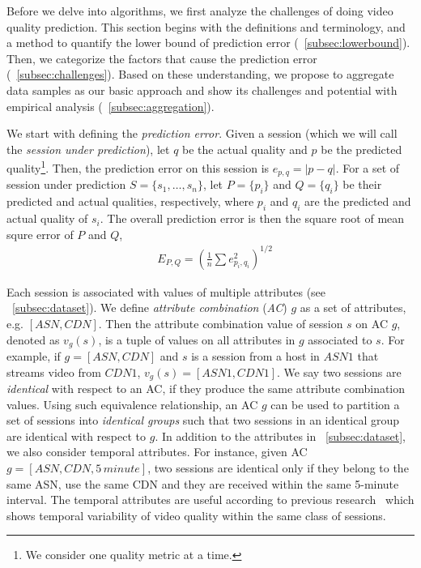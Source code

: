 \label{sec:challenges}


Before we delve into algorithms, we first analyze the challenges of doing video quality prediction. This section begins with the definitions and terminology, and a method to quantify the lower bound of prediction error (\Section~\ref{subsec:lowerbound}). Then, we categorize the factors that cause the prediction error (\Section~\ref{subsec:challenges}). Based on these understanding, we propose to aggregate data samples as our basic approach and show its challenges and potential with empirical analysis (\Section~\ref{subsec:aggregation}).


\label{subsec:lowerbound}


 We start with defining the {\it prediction error}.  Given a session
(which we will call the {\it session under prediction}), let $q$ be
the actual quality and $p$ be the predicted quality\footnote{We consider one quality metric at a time.}. Then, the
prediction error on this session is $e_{p,q}=|p-q|$.
For a set of session under prediction $S=\{s_1,\dots,s_n\}$, let $P=\{p_i\}$ and $Q=\{q_i\}$ be their predicted and actual qualities, respectively, where $p_i$ and $q_i$ are the predicted and actual quality of $s_i$. The overall prediction error is then the square root of mean squre error of $P$ and $Q$, 
\begin{align}
&E_{P,Q}=\left(\frac{1}{n}\sum e_{p_i,q_i}^2\right)^{1/2}
\end{align}

 Each session is associated with values of multiple attributes (see \Section~\ref{subsec:dataset}). We define {\it attribute combination} ({\it AC}) $g$ as a set of attributes, e.g. $[ASN, CDN]$. Then the attribute combination value of session $s$ on AC $g$, denoted as $v_g(s)$, is a tuple of values on all attributes in $g$ associated to $s$. For example, if $g=[ASN,CDN]$ and $s$ is a session from a host in $ASN1$ that streams video from $CDN1$, $v_g(s)=[ASN1, CDN1]$. We say two sessions are {\it identical} with respect to an AC, if they produce the same attribute combination values. Using such equivalence relationship, an AC $g$ can be used to partition a set of sessions into {\it identical groups} such that two sessions in an identical group are identical with respect to $g$.
 In addition to the attributes in \Section~\ref{subsec:dataset}, we also consider temporal attributes. For instance, given AC $g=[ASN, CDN, 5\,minute]$, two sessions are identical only if they belong to the same ASN, use the same CDN and they are received within the same 5-minute interval. The temporal attributes are useful according to previous research~\cite{sigcomm12} which shows temporal variability of video quality within the same class of sessions.

